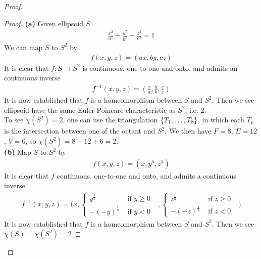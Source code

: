 \documentclass{report}
\begin{document}
\begin{proof}
\begin{question}{}{}
\end{question}
\begin{proof}
\textbf{(a)} Given ellipsoid $S$ 
\begin{align*}
\frac{x^2}{a^2}+ \frac{y^2}{b^2}+ \frac{z^2}{c^2}=1
\end{align*}
We can map $S$ to  $S^2$ by 
 \begin{align*}
f(x,y,z)=(ax,by,cz)
\end{align*}
It is clear that $f:S\rightarrow S^2$ is continuous, one-to-one and onto, and admits an continuous inverse 
\begin{align*}
f^{-1}(x,y,z)= (\frac{x}{a},\frac{y}{b},\frac{c}{z})
\end{align*}
It is now established that $f$ is a homeomorphism between $S\text{ and }S^2$. Then we see ellipsoid have the same Euler-Poincare characteristic as $S^2$, i.e. 2.\\

To see $\chi (S^2)=2$, one can use the triangulation $\{ T_1,\dots ,T_8 \}$, in which each $T_k$ is the intersection between one of the octant and $S^2$. We then have  $F=8$,  $E=12$, $V=6$, so $\chi (S^2)=8-12+6=2$.\\

\textbf{(b)} Map $S$ to $S^2$ by 
 \begin{align*}
f(x,y,z)=(x,y^5,z^3)
\end{align*}
It is clear that $f$ continuous, one-to-one and onto, and admits a continuous inverse 
\begin{align*}
f^{-1}(x,y,z)=\Bigg(x,\begin{cases}
  y^{\frac{1}{5}}& \text{ if $y\geq 0$ } \\
  -(-y)^{\frac{1}{5}}& \text{ if $y<0$ }
\end{cases}, \begin{cases}
  z^{\frac{1}{3}}& \text{ if $z\geq 0$ }\\
  -(-z)^{\frac{1}{3}}& \text{ if $z<0$ }
\end{cases}\Bigg)
\end{align*}
It is now established that $f$ is a homeomorphism between $S$ and  $S^2$. Then we see $\chi (S)=\chi (S^2)=2$
\end{proof}

\end{proof}
\end{document}
